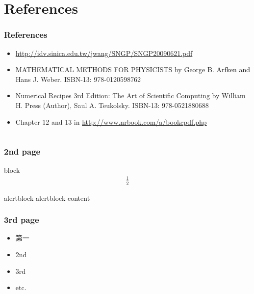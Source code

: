 \documentclass{beamer}
\begin{document}
\section{References}
\begin{frame}
\frametitle{References}
\begin{itemize}
\item \url{http://idv.sinica.edu.tw/jwang/SNGP/SNGP20090621.pdf}
\item MATHEMATICAL METHODS FOR PHYSICISTS by George B. Arfken and Hans J. Weber. ISBN-13: 978-0120598762
\item Numerical Recipes 3rd Edition: The Art of Scientific Computing by William H. Press  (Author), Saul A. Teukolsky. ISBN-13: 978-0521880688
\item Chapter 12 and 13 in \url{http://www.nrbook.com/a/bookcpdf.php}
\end{itemize}
\end{frame}
\section{}
\begin{frame}
\frametitle{2nd page}
\begin{block}{block}
\begin{eqnarray}
\frac{1}{2}
\end{eqnarray}
\end{block}
\begin{alertblock}{alertblock}
alertblock content
\end{alertblock}
\end{frame}
\begin{frame}
\frametitle{3rd page}
\begin{itemize}
\item<1-> 第一
\item<1-> 2nd
\item<2-> 3rd
\item<3-> etc.
\hyperlink{1stpage}{}
\end{itemize}
\end{frame}
\end{document}
